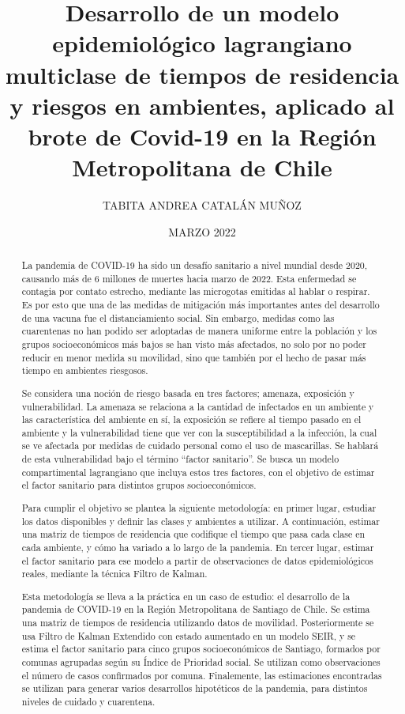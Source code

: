 \documentclass[upright, contnum]{umemoria}
\author{TABITA ANDREA CATALÁN MUÑOZ}
\title{Desarrollo de un modelo epidemiológico lagrangiano multiclase de tiempos de residencia y riesgos en ambientes, aplicado al brote de Covid-19 en la Región Metropolitana de Chile}
\date{MARZO 2022}
\begin{document}
\frontmatter
\maketitle

\begin{abstract}

La pandemia de COVID-19 ha sido un desafío sanitario a nivel mundial desde 2020, causando más de 6 millones de muertes hacia marzo de 2022. Esta enfermedad se contagia por contato estrecho, mediante las microgotas emitidas al hablar o respirar. Es por esto que una de las medidas de mitigación más importantes antes del desarrollo de una vacuna fue el distanciamiento social. Sin embargo, medidas como las cuarentenas no han podido ser adoptadas de manera uniforme entre la población y los grupos socioeconómicos más bajos se han visto más afectados, no solo por no poder reducir en menor medida su movilidad, sino que también por el hecho de pasar más tiempo en ambientes riesgosos.

Se considera una noción de riesgo basada en tres factores; amenaza, exposición y vulnerabilidad. La amenaza se relaciona a la cantidad de infectados en un ambiente y las característica del ambiente en sí, la exposición se refiere al tiempo pasado en el ambiente y la vulnerabilidad tiene que ver con la susceptibilidad a la infección, la cual se ve afectada por medidas de cuidado personal como el uso de mascarillas. Se hablará de esta vulnerabilidad bajo el término ``factor sanitario''. Se busca un modelo compartimental lagrangiano que incluya estos tres factores, con el objetivo de estimar el factor sanitario para distintos grupos socioeconómicos.

Para cumplir el objetivo se plantea la siguiente metodología: en primer lugar, estudiar los datos disponibles y definir las clases y ambientes a utilizar. A continuación, estimar una matriz de tiempos de residencia que codifique el tiempo que pasa cada clase en cada ambiente, y cómo ha variado a lo largo de la pandemia. En tercer lugar, estimar el factor sanitario para ese modelo a partir de observaciones de datos epidemiológicos reales, mediante la técnica Filtro de Kalman.

Esta metodología se lleva a la práctica en un caso de estudio: el desarrollo de la pandemia de COVID-19 en la Región Metropolitana de Santiago de Chile. Se estima una matriz de tiempos de residencia utilizando datos de movilidad. Posteriormente se usa Filtro de Kalman Extendido con estado aumentado en un modelo SEIR, y se estima el factor sanitario para cinco grupos socioeconómicos de Santiago, formados por comunas agrupadas según su Índice de Prioridad social. Se utilizan como observaciones el número de casos confirmados por comuna. Finalemente, las estimaciones encontradas se utilizan para generar varios desarrollos hipotéticos de la pandemia, para distintos niveles de cuidado y cuarentena.


\end{abstract}
\end{document}
